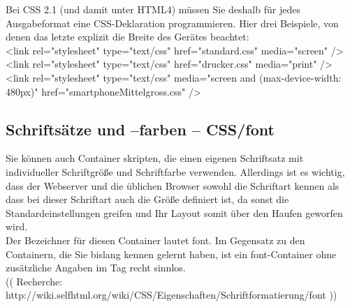 Bei CSS 2.1 (und damit unter HTML4) müssen Sie deshalb für jedes Ausgabeformat eine CSS-Deklaration programmieren. Hier drei Beispiele, von denen das letzte explizit die Breite des Gerätes beachtet:\\

<link rel="stylesheet" type="text/css" href="standard.css" media="screen" />\\

<link rel="stylesheet" type="text/css" href="drucker.css" media="print" />\\

<link rel="stylesheet" type="text/css" media="screen and (max-device-width: 480px)" href="smartphoneMittelgross.css" />

\subsection{Schriftsätze und –farben – CSS/font}

Sie können auch Container skripten, die einen eigenen Schriftsatz mit individueller Schriftgröße und Schriftfarbe verwenden. Allerdings ist es wichtig, dass der Webserver und die üblichen Browser sowohl die Schriftart kennen als dass bei dieser Schriftart auch die Größe definiert ist, da sonst die Standardeinstellungen greifen und Ihr Layout somit über den Haufen geworfen wird.\\

Der Bezeichner für diesen Container lautet font. Im Gegensatz zu den Containern, die Sie bislang kennen gelernt haben, ist ein font-Container ohne zusätzliche Angaben im Tag recht sinnlos.\\

(( Recherche: http://wiki.selfhtml.org/wiki/CSS/Eigenschaften/Schriftformatierung/font ))

